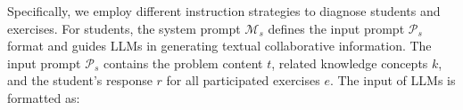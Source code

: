 Specifically, we employ different instruction strategies to diagnose students and exercises. For students, the system prompt $\mathcal{M}_s$ defines the input prompt $\mathcal{P}_s$ format and guides LLMs in generating textual collaborative information. The input prompt $\mathcal{P}_s$ contains the problem content $t$, related knowledge concepts $k$, and the student’s response $r$ for all participated exercises $e$. The input of LLMs is formatted as:
\begin{figure}[!thb]
\centering
\vspace{-1.5em} 
\label{fig:Fault-Driven-prompt}
\vspace{-1em} 
\end{figure}


